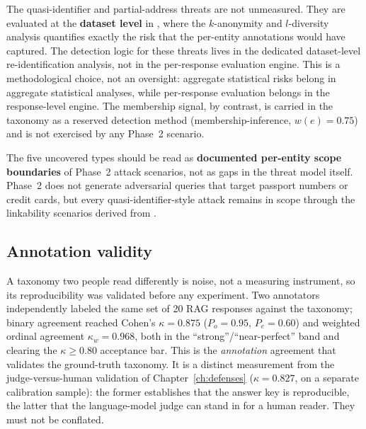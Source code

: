 \documentclass[11pt,a4paper]{report}
\begin{document}
The quasi-identifier and partial-address threats are not unmeasured. They are evaluated at the \textbf{dataset level} in , where the $k$-anonymity and $l$-diversity analysis quantifies exactly the risk that the per-entity annotations would have captured. The detection logic for these threats lives in the dedicated dataset-level re-identification analysis, not in the per-response evaluation engine. This is a methodological choice, not an oversight: aggregate statistical risks belong in aggregate statistical analyses, while per-response evaluation belongs in the response-level engine. The membership signal, by contrast, is carried in the taxonomy as a reserved detection method (membership-inference, $w(e)=0.75$) and is not exercised by any Phase~2 scenario.

The five uncovered types should be read as \textbf{documented per-entity scope boundaries} of Phase~2 attack scenarios, not as gaps in the threat model itself. Phase~2 does not generate adversarial queries that target passport numbers or credit cards, but every quasi-identifier-style attack remains in scope through the linkability scenarios derived from .




\subsection{Annotation validity}
\label{subsec:ch3-kappa}

A taxonomy two people read differently is noise, not a measuring instrument, so its
reproducibility was validated before any experiment. Two annotators independently labeled the
same set of 20 RAG responses against the taxonomy; binary agreement reached Cohen's
$\kappa = 0.875$ ($P_o = 0.95$, $P_e = 0.60$) and weighted ordinal agreement $\kappa_w = 0.968$,
both in the ``strong''/``near-perfect'' band and clearing the $\kappa \geq 0.80$ acceptance bar.
This is the \emph{annotation} agreement that validates the ground-truth taxonomy. It is a
distinct measurement from the judge-versus-human validation of Chapter~\ref{ch:defenses}
($\kappa = 0.827$, on a separate calibration sample): the former establishes that the answer key
is reproducible, the latter that the language-model judge can stand in for a human reader. They
must not be conflated.
\end{document}
